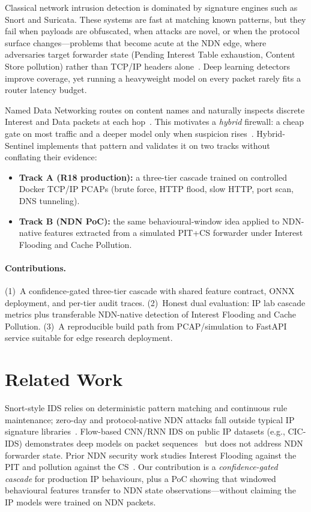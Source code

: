 \documentclass[conference]{IEEEtran}
\begin{document}
Classical network intrusion detection is dominated by signature engines such as Snort and Suricata. These systems are fast at matching known patterns, but they fail when payloads are obfuscated, when attacks are novel, or when the protocol surface changes---problems that become acute at the NDN edge, where adversaries target forwarder state (Pending Interest Table exhaustion, Content Store pollution) rather than TCP/IP headers alone~\cite{ndn,afiha}. Deep learning detectors improve coverage, yet running a heavyweight model on every packet rarely fits a router latency budget.

Named Data Networking routes on content names and naturally inspects discrete Interest and Data packets at each hop~\cite{ndn}. This motivates a \emph{hybrid} firewall: a cheap gate on most traffic and a deeper model only when suspicion rises~\cite{tcl-wiki}. Hybrid-Sentinel implements that pattern and validates it on two tracks without conflating their evidence:
\begin{itemize}
\item \textbf{Track A (R18 production):} a three-tier cascade trained on controlled Docker TCP/IP PCAPs (brute force, HTTP flood, slow HTTP, port scan, DNS tunneling).
\item \textbf{Track B (NDN PoC):} the same behavioural-window idea applied to NDN-native features extracted from a simulated PIT+CS forwarder under Interest Flooding and Cache Pollution.
\end{itemize}

\paragraph{Contributions.}
(1)~A confidence-gated three-tier cascade with shared feature contract, ONNX deployment, and per-tier audit traces. (2)~Honest dual evaluation: IP lab cascade metrics plus transferable NDN-native detection of Interest Flooding and Cache Pollution. (3)~A reproducible build path from PCAP/simulation to FastAPI service suitable for edge research deployment.

\section{Related Work}
\label{sec:related}

Snort-style IDS relies on deterministic pattern matching and continuous rule maintenance; zero-day and protocol-native NDN attacks fall outside typical IP signature libraries~\cite{afiha}. Flow-based CNN/RNN IDS on public IP datasets (e.g., CIC-IDS) demonstrates deep models on packet sequences~\cite{cicids} but does not address NDN forwarder state. Prior NDN security work studies Interest Flooding against the PIT and pollution against the CS~\cite{afiha,compagno}. Our contribution is a \emph{confidence-gated cascade} for production IP behaviours, plus a PoC showing that windowed behavioural features transfer to NDN state observations---without claiming the IP models were trained on NDN packets.
\end{document}
